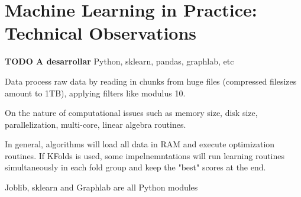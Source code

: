 \section{Machine Learning in Practice: Technical Observations}\label{section-technicalObservations}
\textbf{TODO A desarrollar}
Python, sklearn, pandas, graphlab, etc

Data process raw data by reading in chunks from huge files (compressed filesizes amount to 1TB), applying filters like modulus 10.

On the nature of computational issues such as memory size, disk size, parallelization, multi-core, linear algebra routines.

In general, algorithms will load all data in RAM and execute optimization routines. If KFolds is used, some impelnemntations will run learning routines simultaneously in each fold group and keep the "best" scores at the end.

Joblib, sklearn and Graphlab are all Python modules



